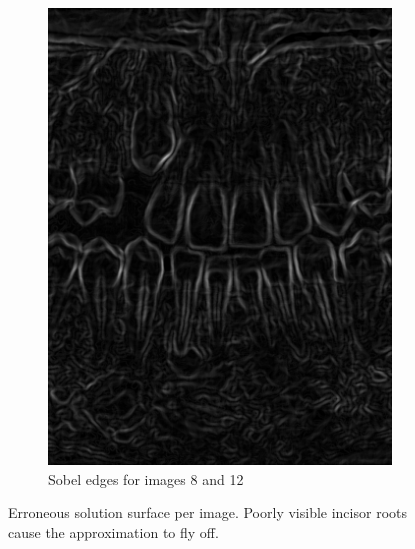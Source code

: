 \documentclass[a4paper,titlepage,12pt]{article}
\begin{document}
\begin{figure}
\begin{subfigure}{0.48\linewidth}
		\includegraphics[width=0.48\columnwidth]{results/12sobel}
		\caption{Sobel edges for images 8 and 12}
	\end{subfigure}
	\caption{Erroneous solution surface per image. Poorly visible incisor roots cause the approximation to fly off. }
	\label{fig:sol}
\end{figure}



\end{document}
